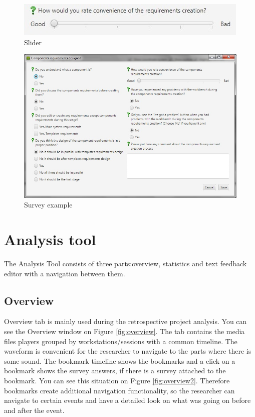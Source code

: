  \begin{figure}[htb]
 \centering
\includegraphics{figures/slider.jpg}
\caption{Slider}
\label{fig:slider}
 \end{figure}
 

 \begin{figure}[htb]
 \centering
\includegraphics[width=\textwidth]{figures/comp_survey.jpg}
\caption{Survey example}
\label{fig:survey}
 \end{figure}
 
\section{Analysis tool} \label{section:analysis_tool}
The Analysis Tool consists of three parts:overview, statistics and text feedback editor with a navigation between them.

\subsection{Overview}
Overview tab is mainly used during the retrospective project analysis. You can see the Overview window on Figure \ref{fig:overview}. The tab contains the media files players grouped by workstations/sessions with a common timeline. The waveform is convenient for the researcher to navigate to the parts where there  is some sound. The bookmark timeline shows the bookmarks and a click on a bookmark shows the survey answers, if there is a survey attached to the bookmark. You can see this situation on Figure \ref{fig:overview2}. Therefore bookmarks create additional navigation functionality, so the researcher can navigate to certain events and have a detailed look on what was going on before and after the event.\\

